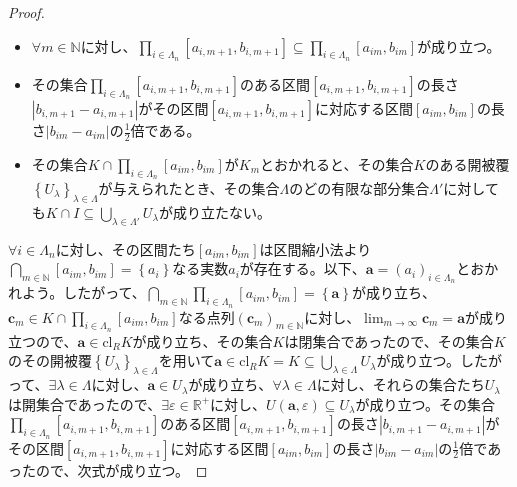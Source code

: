 \documentclass[dvipdfmx]{jsarticle}
\begin{document}
\begin{proof}
\begin{itemize}
\item
  $\forall m \in \mathbb{N}$に対し、$\prod_{i \in \varLambda_{n}} \left[ a_{i,m + 1},b_{i,m + 1} \right] \subseteq \prod_{i \in \varLambda_{n}} \left[ a_{im},b_{im} \right]$が成り立つ。
\item
  その集合$\prod_{i \in \varLambda_{n}} \left[ a_{i,m + 1},b_{i,m + 1} \right]$のある区間$\left[ a_{i,m + 1},b_{i,m + 1} \right]$の長さ$\left| b_{i,m + 1} - a_{i,m + 1} \right|$がその区間$\left[ a_{i,m + 1},b_{i,m + 1} \right]$に対応する区間$\left[ a_{im},b_{im} \right]$の長さ$\left| b_{im} - a_{im} \right|$の$\frac{1}{2}$倍である。
\item
  その集合$K \cap \prod_{i \in \varLambda_{n}} \left[ a_{im},b_{im} \right]$が$K_{m}$とおかれると、その集合$K$のある開被覆$\left\{ U_{\lambda} \right\}_{\lambda \in \varLambda}$が与えられたとき、その集合$\varLambda$のどの有限な部分集合$\varLambda'$に対しても$K \cap I \subseteq \bigcup_{\lambda \in \varLambda'} U_{\lambda}$が成り立たない。
\end{itemize}
$\forall i \in \varLambda_{n}$に対し、その区間たち$\left[ a_{im},b_{im} \right]$は区間縮小法より$\bigcap_{m \in \mathbb{N}} \left[ a_{im},b_{im} \right] = \left\{ a_{i} \right\}$なる実数$a_{i}$が存在する。以下、$\mathbf{a} = \left( a_{i} \right)_{i \in \varLambda_{n}}$とおかれよう。したがって、$\bigcap_{m \in \mathbb{N}} {\prod_{i \in \varLambda_{n}} \left[ a_{im},b_{im} \right]} = \left\{ \mathbf{a} \right\}$が成り立ち、$\mathbf{c}_{m} \in K \cap \prod_{i \in \varLambda_{n}} \left[ a_{im},b_{im} \right]$なる点列$\left( \mathbf{c}_{m} \right)_{m \in \mathbb{N}}$に対し、$\lim_{m \rightarrow \infty}\mathbf{c}_{m} = \mathbf{a}$が成り立つので、$\mathbf{a} \in \mathrm{cl}_{R}K$が成り立ち、その集合$K$は閉集合であったので、その集合$K$のその開被覆$\left\{ U_{\lambda} \right\}_{\lambda \in \varLambda}$を用いて$\mathbf{a} \in \mathrm{cl}_{R}K = K \subseteq \bigcup_{\lambda \in \varLambda} U_{\lambda}$が成り立つ。したがって、$\exists\lambda \in \varLambda$に対し、$\mathbf{a} \in U_{\lambda}$が成り立ち、$\forall\lambda \in \varLambda$に対し、それらの集合たち$U_{\lambda}$は開集合であったので、$\exists\varepsilon \in \mathbb{R}^{+}$に対し、$U\left( \mathbf{a},\varepsilon \right) \subseteq U_{\lambda}$が成り立つ。その集合$\prod_{i \in \varLambda_{n}} \left[ a_{i,m + 1},b_{i,m + 1} \right]$のある区間$\left[ a_{i,m + 1},b_{i,m + 1} \right]$の長さ$\left| b_{i,m + 1} - a_{i,m + 1} \right|$がその区間$\left[ a_{i,m + 1},b_{i,m + 1} \right]$に対応する区間$\left[ a_{im},b_{im} \right]$の長さ$\left| b_{im} - a_{im} \right|$の$\frac{1}{2}$倍であったので、次式が成り立つ。

\end{proof}
\end{document}
